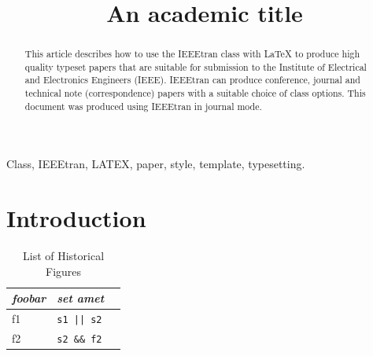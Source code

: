 \documentclass[10pt,conference,compsocconf]{IEEEtran}
\begin{document}

\title{\textbf{\Large An academic title}\\[0.2ex]}

\author{
\and
{}
\IEEEauthorblockA{}}
\maketitle

\begin{abstract}
This article describes how to use the IEEEtran class with LaTeX to produce high
quality typeset papers that are suitable for submission to the Institute of
Electrical and Electronics Engineers (IEEE). IEEEtran can produce conference,
journal and technical note (correspondence) papers with a suitable choice of
class options. This document was produced using IEEEtran in journal mode.
\end{abstract}

\begin{IEEEkeywords}
Class, IEEEtran, LATEX, paper, style, template, typesetting.
\end{IEEEkeywords}

\section{Introduction}
\label{introduction}

\begin{table}[htbp]
\caption{List of Historical Figures}
\label{historicalFigures}
\centering
\begin{tabular}{lll}
\hline
\textit{foobar} & \textit{set amet} \\
\hline
f1 & \texttt{s1 || s2}\\
f2 & \texttt{s2 \&\& f2}\\
\hline
\end{tabular}
\end{table}
\end{document}
